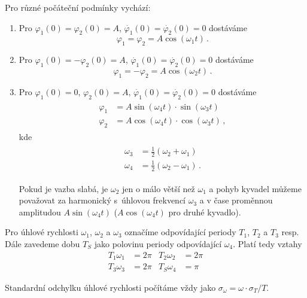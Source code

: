 Pro různé počáteční podmínky vychází:
\begin{enumerate}
\item Pro $\varphi _1 (0) = \varphi _2 (0) = A$, $\dot{\varphi_1}(0)=\dot{\varphi_2}(0)=0$ dostáváme
\begin{equation} \label{eq::philist1}
\varphi _1 = \varphi _2 = A \cos(\omega _1 t)\,.
\end{equation}
\item Pro $\varphi _1 (0) = - \varphi _2 (0) = A$, $\dot{\varphi_1}(0)=\dot{\varphi_2}(0)=0$ dostáváme
\begin{equation} \label{eq::philist2}
\varphi _1 = - \varphi _2 = A \cos(\omega _2 t) \,.
\end{equation}
\item Pro $\varphi _1 (0) = 0$, $\varphi _2 (0) = A$, $\dot{\varphi_1}(0)=\dot{\varphi_2}(0)=0$ dostáváme
\begin{align}
\label{eq::philist3}
\begin{split}
 \varphi_1 &= A \sin(\omega_4 t) \cdot \sin(\omega_3 t)
\\
 \varphi_2 &= A \cos(\omega_4 t) \cdot \cos(\omega_3 t) \,,
\end{split}
\end{align}
kde
\begin{align}
\label{eq::omega34}
\begin{split}
 \omega_3 &= \frac{1}{2}(\omega_2 + \omega_1)
\\
 \omega_4 &= \frac{1}{2}(\omega_2 - \omega_1) \,.
\end{split}
\end{align}

Pokud je vazba slabá, je $\omega _2$ jen o málo větší než $\omega_1$ a pohyb kyvadel můžeme považovat za harmonický s~úhlovou frekvencí $\omega_3$ a v čase proměnnou amplitudou $A \sin(\omega_4 t)$ ($A \cos(\omega_4 t)$ pro druhé kyvadlo). 

\end{enumerate}

Pro úhlové rychlosti $\omega_1$, $\omega_2$ a $\omega_3$ označíme odpovídající periody $T_1$, $T_2$ a $T_3$ resp.
Dále zavedeme dobu $T_S$ jako polovinu periody odpovídající $\omega_4$. Platí tedy vztahy
\begin{align}
\label{eq::periodyvztahy}
 T_1 \omega_1 &= 2\pi & T_2 \omega_2 &=2\pi \nonumber \\
 T_3 \omega_3 &= 2\pi & T_S \omega_4 &=\pi
\end{align}

Standardní odchylku úhlové rychlosti počítáme vždy jako $\sigma_\omega=\omega \cdot \sigma_T / T$.

